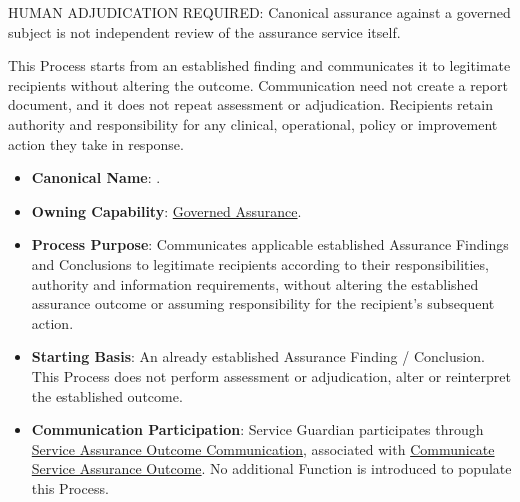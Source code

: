HUMAN ADJUDICATION REQUIRED: Canonical assurance against a governed subject is not independent review of the assurance service itself.



This Process starts from an established finding and communicates it to legitimate recipients without altering the outcome. Communication need not create a report document, and it does not repeat assessment or adjudication. Recipients retain authority and responsibility for any clinical, operational, policy or improvement action they take in response.



\begin{itemize}

\item
\textbf{Canonical Name}: \texttt{}.



\item
\textbf{Owning Capability}: \href{https://github.com/fhirfactory/harmonia/blob/98410db60155198a75f74c79d98060070209faa1/docs/markdown/02-strategy/capabilities/business-enabling-capabilities.md\#governed-assurance}{Governed Assurance}.



\item
\textbf{Process Purpose}: Communicates applicable established Assurance Findings and Conclusions to legitimate recipients according to their responsibilities, authority and information requirements, without altering the established assurance outcome or assuming responsibility for the recipient's subsequent action.



\item
\textbf{Starting Basis}: An already established Assurance Finding /\allowbreak{} Conclusion. This Process does not perform assessment or adjudication, alter or reinterpret the established outcome.



\item
\textbf{Communication Participation}: Service Guardian participates through \href{https://github.com/fhirfactory/harmonia/blob/98410db60155198a75f74c79d98060070209faa1/docs/markdown/03-business-architecture/collaborations-interactions/interactions.md\#service-assurance-outcome-communication}{Service Assurance Outcome Communication}, associated with \href{https://github.com/fhirfactory/harmonia/blob/98410db60155198a75f74c79d98060070209faa1/docs/markdown/03-business-architecture/behaviours/health-service-assurance.md\#communicate-service-assurance-outcome}{Communicate Service Assurance Outcome}. No additional Function is introduced to populate this Process.




\end{itemize}
